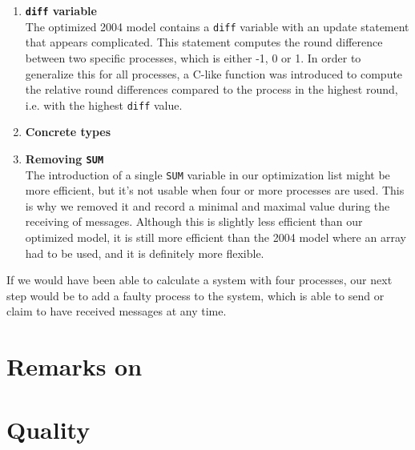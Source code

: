 \documentclass[a4paper,10pt]{article}
\begin{document}
\begin{enumerate}
\item \textbf{\texttt{diff} variable} \\
	The optimized 2004 model contains a \texttt{diff} variable with an update statement that appears complicated. This statement computes the round difference between two specific processes, which is either -1, 0 or 1. In order to generalize this for all processes, a C-like function was introduced to compute the relative round differences compared to the process in the highest round, i.e. with the highest \texttt{diff} value.

\item \textbf{Concrete types} \\

\item \textbf{Removing \texttt{SUM}} \\
	The introduction of a single \texttt{SUM} variable in our optimization list might be more efficient, but it's not usable when four or more processes are used. This is why we removed it and record a minimal and maximal value during the receiving of messages. Although this is slightly less efficient than our optimized model, it is still more efficient than the 2004 model where an array had to be used, and it is definitely more flexible.
\end{enumerate}

If we would have been able to calculate a system with four processes, our next step would be to add a faulty process to the system, which is able to send or claim to have received messages at any time.


\section{Remarks on \cite{Aceto2004Notes}\label{sec:remarks}}


\section{Quality\label{sec:quality}}
\end{document}

